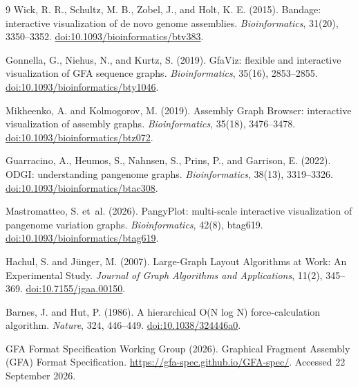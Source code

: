 \documentclass[11pt]{article}
\begin{document}
\begin{thebibliography}{9}
Wick, R. R., Schultz, M. B., Zobel, J., and Holt, K. E. (2015).
Bandage: interactive visualization of de novo genome assemblies.
\emph{Bioinformatics}, 31(20), 3350--3352.
\href{https://doi.org/10.1093/bioinformatics/btv383}{doi:10.1093/bioinformatics/btv383}.

Gonnella, G., Niehus, N., and Kurtz, S. (2019).
GfaViz: flexible and interactive visualization of GFA sequence graphs.
\emph{Bioinformatics}, 35(16), 2853--2855.
\href{https://doi.org/10.1093/bioinformatics/bty1046}{doi:10.1093/bioinformatics/bty1046}.

Mikheenko, A. and Kolmogorov, M. (2019).
Assembly Graph Browser: interactive visualization of assembly graphs.
\emph{Bioinformatics}, 35(18), 3476--3478.
\href{https://doi.org/10.1093/bioinformatics/btz072}{doi:10.1093/bioinformatics/btz072}.

Guarracino, A., Heumos, S., Nahnsen, S., Prins, P., and Garrison, E. (2022).
ODGI: understanding pangenome graphs.
\emph{Bioinformatics}, 38(13), 3319--3326.
\href{https://doi.org/10.1093/bioinformatics/btac308}{doi:10.1093/bioinformatics/btac308}.

Mastromatteo, S. et~al. (2026).
PangyPlot: multi-scale interactive visualization of pangenome variation graphs.
\emph{Bioinformatics}, 42(8), btag619.
\href{https://doi.org/10.1093/bioinformatics/btag619}{doi:10.1093/bioinformatics/btag619}.

Hachul, S. and J\"unger, M. (2007).
Large-Graph Layout Algorithms at Work: An Experimental Study.
\emph{Journal of Graph Algorithms and Applications}, 11(2), 345--369.
\href{https://doi.org/10.7155/jgaa.00150}{doi:10.7155/jgaa.00150}.

Barnes, J. and Hut, P. (1986).
A hierarchical O(N log N) force-calculation algorithm.
\emph{Nature}, 324, 446--449.
\href{https://doi.org/10.1038/324446a0}{doi:10.1038/324446a0}.

GFA Format Specification Working Group (2026).
Graphical Fragment Assembly (GFA) Format Specification.
\url{https://gfa-spec.github.io/GFA-spec/}. Accessed 22 September 2026.


\end{thebibliography}
\end{document}
